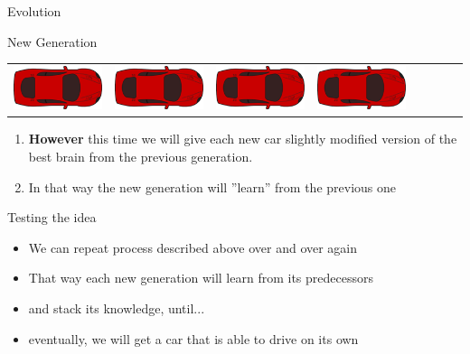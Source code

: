 \documentclass{do}
\begin{document}
\begin{frame}{Evolution}
\begin{block}{New Generation}
\begin{tabular}{c|c|c|c|c|c|c|c}
            \includegraphics[scale=0.25]{car.png}&
            \includegraphics[scale=0.25]{car.png}&
            \includegraphics[scale=0.25]{car.png}&
            \includegraphics[scale=0.25]{car.png}

        \end{tabular}
        \begin{enumerate}
            \item \textbf{However} this time we will give each new car slightly modified version of
            the best brain from the previous generation.
            \item In that way the new generation will ”learn” from the previous one
        \end{enumerate}
    \end{block}
    \begin{alertblock}{Testing the idea}
        \footnotesize
            \begin{itemize}
                \item We can repeat process described above over and over again
                \item That way each new generation will learn from its predecessors
                \item and stack its knowledge, until...
                \item eventually, we will get a car that is able to drive on its own
            \end{itemize}
    \end{alertblock}
  

\end{frame}
\end{document}
